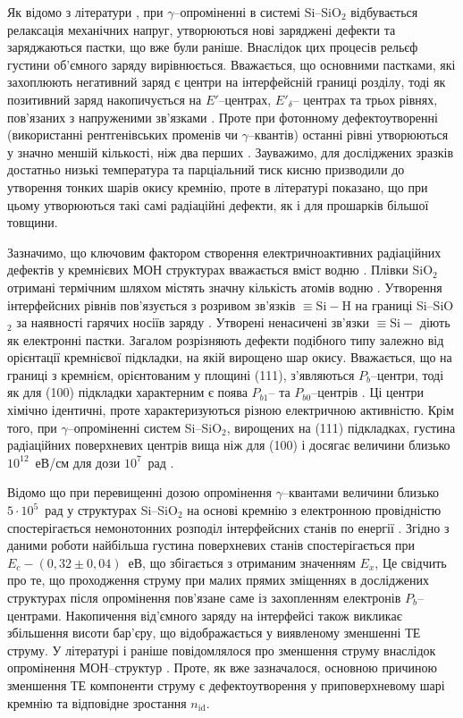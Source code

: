 Як відомо з літератури \cite{PersenkovBook}, при $\gamma$--опроміненні в системі Si--SiO$_2$
відбувається релаксація механічних напруг,
утворюються нові заряджені дефекти та заряджаються пастки, що вже були раніше.
Внаслідок цих процесів рельєф густини об'ємного заряду вирівнюється.
Вважається, що основними пастками, які захоплюють негативний заряд є центри на інтерфейсній границі розділу,
тоді як позитивний заряд накопичується на $E'$--центрах, $E'_\delta$-- центрах та трьох рівнях, пов'язаних
з напруженими зв'язками \cite{SiO2:Devine,SiO2:Lenahan}.
Проте при фотонному дефектоутворенні (використанні рентгенівських променів чи $\gamma$--квантів) останні рівні утворюються у значно меншій кількості, ніж два перших \cite{SiO2:Devine}.
Зауважимо, для досліджених зразків достатньо низькі температура та парціальний тиск кисню призводили до утворення тонких шарів окису кремнію, проте в літературі \cite{SiO2:Cantin} показано, що при цьому утворюються такі самі радіаційні дефекти, як і для прошарків більшої товщини.

Зазначимо, що ключовим фактором створення електричноактивних радіаційних дефектів у кремнієвих МОН структурах вважається вміст водню \cite{SiO2:Cantin}.
Плівки SiO$_2$ отримані термічним шляхом містять значну кількість атомів водню \cite{PersenkovBook}.
Утворення інтерфейсних рівнів пов'язується з розривом зв'язків $\equiv\!\text{Si}\!-\!\text{H}$ на границі Si--SiO$_2$ за наявності гарячих носіїв заряду \cite{SiO2:Mahapatra,SiO2:Esseni}.
Утворені ненасичені зв'язки $\equiv\text{Si}-$  діють як електронні пастки.
Загалом розрізняють дефекти подібного типу залежно від орієнтації кремнієвої підкладки, на якій вирощено шар окису.
Вважається, що на границі з кремнієм, орієнтованим у площині (111), з'являються $P_b$--центри, тоді
як для (100) підкладки характерним є поява $P_{b1}$-- та $P_{b0}$--центрів \cite{SiO2:Rev}.
Ці центри хімічно ідентичні, проте характеризуються різною електричною активністю.
Крім того, при $\gamma$--опроміненні систем Si--SiO$_2$, вирощених на (111) підкладках, густина радіаційних поверхневих центрів вища ніж для (100) і досягає величини близько $10^{12}$~еВ/см для дози $10^{7}$~рад \cite{PersenkovBook}.

Відомо що при перевищенні дозою опромінення $\gamma$--квантами величини близько $5\cdot10^5$~рад у структурах Si--SiO$_2$ на основі кремнію з електронною провідністю спостерігається немонотонних розподіл інтерфейсних станів по енергії \cite{PersenkovBook}.
Згідно з даними роботи \cite{ParchSiO2} найбільша густина поверхневих станів спостерігається при
$E_c-(0,32\pm0,04)$~еВ, що збігається з отриманим значенням $E_x$,
Це свідчить про те, що проходження струму при малих прямих зміщеннях в досліджених структурах після опромінення пов'язане саме із захопленням електронів $P_b$--центрами.
Накопичення від'ємного заряду на інтерфейсі також викликає збільшення висоти бар'єру,
що відображається у виявленому зменшенні ТЕ струму.
У літературі і раніше повідомлялося про зменшення струму внаслідок опромінення МОН--структур \cite{SiO2:Niu}.
Проте, як вже зазначалося, основною причиною зменшення ТЕ компоненти струму є дефектоутворення у приповерхневому шарі кремнію та відповідне зростання $n_\mathrm{id}$.

